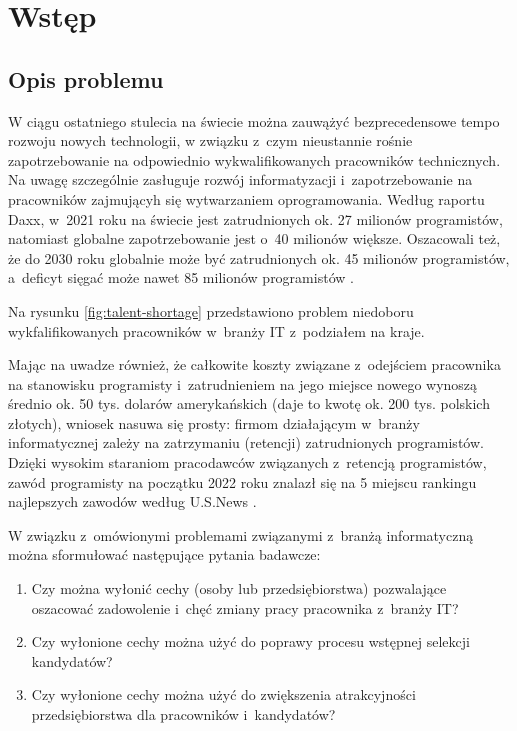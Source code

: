 
\chapter*{Wstęp}\label{ch:admission}

\section*{Opis problemu}\label{sec:admission:problem-description}

W ciągu ostatniego stulecia na świecie można zauwążyć bezprecedensowe tempo rozwoju nowych technologii,
w związku z~czym nieustannie rośnie zapotrzebowanie na odpowiednio wykwalifikowanych pracowników technicznych.
Na uwagę szczególnie zasługuje rozwój informatyzacji i~zapotrzebowanie na pracowników zajmującyh się wytwarzaniem oprogramowania.
Według raportu Daxx, w~2021 roku na świecie jest zatrudnionych ok. 27 milionów programistów, natomiast globalne zapotrzebowanie jest o~40 milionów większe.
Oszacowali też, że do 2030 roku globalnie może być zatrudnionych ok. 45 milionów programistów, a~deficyt sięgać może nawet 85 milionów programistów \cite{daxx-2021}.

Na rysunku \ref{fig:talent-shortage} przedstawiono problem niedoboru wykfalifikowanych pracowników w~branży IT z~podziałem na kraje.


Mając na uwadze również, że całkowite koszty związane z~odejściem pracownika na stanowisku programisty i~zatrudnieniem na jego miejsce nowego
wynoszą średnio ok. 50 tys. dolarów amerykańskich \cite{hairing-dev-2021} (daje to kwotę ok. 200 tys. polskich złotych), wniosek nasuwa się prosty:
firmom działającym w~branży informatycznej zależy na zatrzymaniu (retencji) zatrudnionych programistów.
Dzięki wysokim staraniom pracodawców związanych z~retencją programistów,
zawód programisty na początku 2022 roku znalazł się na 5 miejscu rankingu najlepszych zawodów według U.S.News \cite{us-news-2022}.

W związku z~omówionymi problemami związanymi z~branżą informatyczną można sformułować następujące pytania badawcze:
\begin{enumerate}
    \item Czy można wyłonić cechy (osoby lub przedsiębiorstwa) pozwalające oszacować zadowolenie i~chęć zmiany pracy pracownika z~branży IT?
    \item Czy wyłonione cechy można użyć do poprawy procesu wstępnej selekcji kandydatów?
    \item Czy wyłonione cechy można użyć do zwiększenia atrakcyjności przedsiębiorstwa dla pracowników i~kandydatów?
\end{enumerate}

